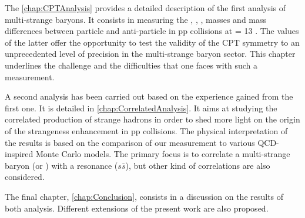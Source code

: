 The \chap\ref{chap:CPTAnalysis} provides a detailed description of the first analysis of multi-strange baryons. It consists in measuring the \rmXiM, \rmAxiP, \rmOmegaM, \rmAomegaP  masses and mass differences between particle and anti-particle in pp collisions at \sqrtS = 13 \tev. The values of the latter offer the opportunity to test the validity of the CPT symmetry to an unprecedented level of precision in the multi-strange baryon sector. This chapter underlines the challenge and the difficulties that one faces with such a measurement.

A second analysis has been carried out based on the experience gained from the first one. It is detailed in \chap\ref{chap:CorrelatedAnalysis}. It aims at studying the correlated production of strange hadrons in order to shed more light on the origin of the strangeness enhancement in pp collisions. The physical interpretation of the results is based on the comparison of our measurement to various QCD-inspired Monte Carlo models. The primary focus is to correlate a multi-strange baryon (\rmXi or \rmOmega) with a \rmPhiMes resonance ($s\bar{s}$), but other kind of correlations are also considered.


The final chapter, \chap\ref{chap:Conclusion}, consists in a discussion on the results of both analysis. Different extensions of the present work are also proposed.
